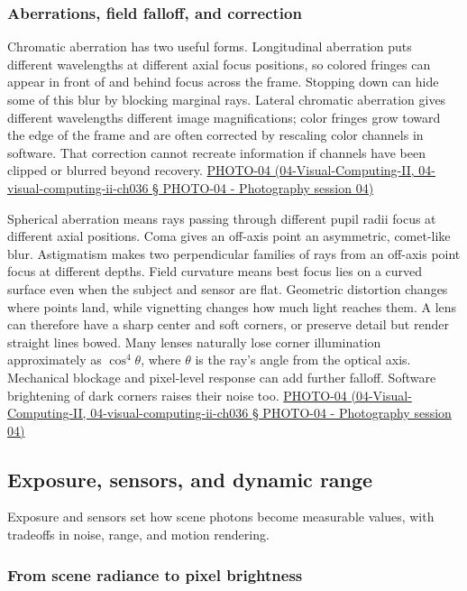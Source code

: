 \subsubsection{Aberrations, field falloff, and correction}\label{aberrations-field-falloff-and-correction}

Chromatic aberration has two useful forms. Longitudinal aberration puts different wavelengths at different axial focus positions, so colored fringes can appear in front of and behind focus across the frame. Stopping down can hide some of this blur by blocking marginal rays. Lateral chromatic aberration gives different wavelengths different image magnifications; color fringes grow toward the edge of the frame and are often corrected by rescaling color channels in software. That correction cannot recreate information if channels have been clipped or blurred beyond recovery. \href{}{PHOTO-04 (04-Visual-Computing-II, 04-visual-computing-ii-ch036 § PHOTO-04 - Photography session 04)}

Spherical aberration means rays passing through different pupil radii focus at different axial positions. Coma gives an off-axis point an asymmetric, comet-like blur. Astigmatism makes two perpendicular families of rays from an off-axis point focus at different depths. Field curvature means best focus lies on a curved surface even when the subject and sensor are flat. Geometric distortion changes where points land, while vignetting changes how much light reaches them. A lens can therefore have a sharp center and soft corners, or preserve detail but render straight lines bowed. Many lenses naturally lose corner illumination approximately as \(\cos^4\theta\), where \(\theta\) is the ray's angle from the optical axis. Mechanical blockage and pixel-level response can add further falloff. Software brightening of dark corners raises their noise too. \href{}{PHOTO-04 (04-Visual-Computing-II, 04-visual-computing-ii-ch036 § PHOTO-04 - Photography session 04)}

\subsection{Exposure, sensors, and dynamic range}\label{exposure-sensors-and-dynamic-range}

Exposure and sensors set how scene photons become measurable values, with tradeoffs in noise, range, and motion rendering.

\subsubsection{From scene radiance to pixel brightness}\label{from-scene-radiance-to-pixel-brightness}

